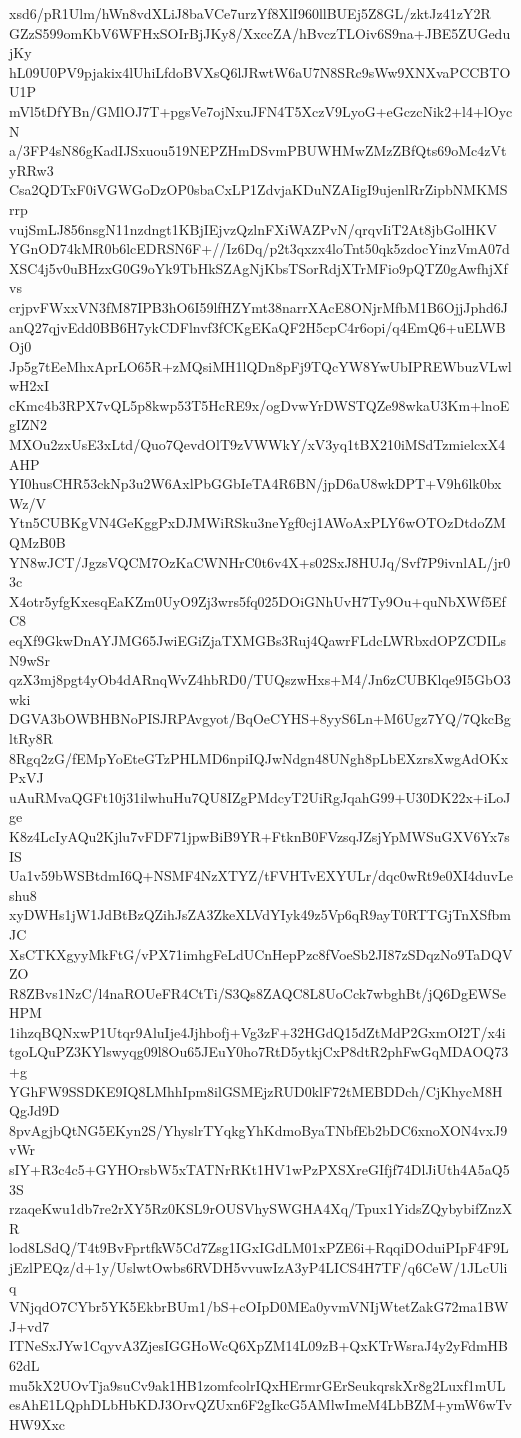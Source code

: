 xsd6/pR1Ulm/hWn8vdXLiJ8baVCe7urzYf8XlI960llBUEj5Z8GL/zktJz41zY2R
GZzS599omKbV6WFHxSOIrBjJKy8/XxccZA/hBvczTLOiv6S9na+JBE5ZUGedujKy
hL09U0PV9pjakix4lUhiLfdoBVXsQ6lJRwtW6aU7N8SRc9sWw9XNXvaPCCBTOU1P
mVl5tDfYBn/GMlOJ7T+pgsVe7ojNxuJFN4T5XczV9LyoG+eGczcNik2+l4+lOycN
a/3FP4sN86gKadIJSxuou519NEPZHmDSvmPBUWHMwZMzZBfQts69oMc4zVtyRRw3
Csa2QDTxF0iVGWGoDzOP0sbaCxLP1ZdvjaKDuNZAIigI9ujenlRrZipbNMKMSrrp
vujSmLJ856nsgN11nzdngt1KBjIEjvzQzlnFXiWAZPvN/qrqvIiT2At8jbGolHKV
YGnOD74kMR0b6lcEDRSN6F+//Iz6Dq/p2t3qxzx4loTnt50qk5zdocYinzVmA07d
XSC4j5v0uBHzxG0G9oYk9TbHkSZAgNjKbsTSorRdjXTrMFio9pQTZ0gAwfhjXfvs
crjpvFWxxVN3fM87IPB3hO6I59lfHZYmt38narrXAcE8ONjrMfbM1B6OjjJphd6J
anQ27qjvEdd0BB6H7ykCDFlnvf3fCKgEKaQF2H5cpC4r6opi/q4EmQ6+uELWBOj0
Jp5g7tEeMhxAprLO65R+zMQsiMH1lQDn8pFj9TQcYW8YwUbIPREWbuzVLwlwH2xI
cKmc4b3RPX7vQL5p8kwp53T5HcRE9x/ogDvwYrDWSTQZe98wkaU3Km+lnoEgIZN2
MXOu2zxUsE3xLtd/Quo7QevdOlT9zVWWkY/xV3yq1tBX210iMSdTzmielcxX4AHP
YI0husCHR53ckNp3u2W6AxlPbGGbIeTA4R6BN/jpD6aU8wkDPT+V9h6lk0bxWz/V
Ytn5CUBKgVN4GeKggPxDJMWiRSku3neYgf0cj1AWoAxPLY6wOTOzDtdoZMQMzB0B
YN8wJCT/JgzsVQCM7OzKaCWNHrC0t6v4X+s02SxJ8HUJq/Svf7P9ivnlAL/jr03c
X4otr5yfgKxesqEaKZm0UyO9Zj3wrs5fq025DOiGNhUvH7Ty9Ou+quNbXWf5EfC8
eqXf9GkwDnAYJMG65JwiEGiZjaTXMGBs3Ruj4QawrFLdcLWRbxdOPZCDILsN9wSr
qzX3mj8pgt4yOb4dARnqWvZ4hbRD0/TUQszwHxs+M4/Jn6zCUBKlqe9I5GbO3wki
DGVA3bOWBHBNoPISJRPAvgyot/BqOeCYHS+8yyS6Ln+M6Ugz7YQ/7QkcBgltRy8R
8Rgq2zG/fEMpYoEteGTzPHLMD6npiIQJwNdgn48UNgh8pLbEXzrsXwgAdOKxPxVJ
uAuRMvaQGFt10j31ilwhuHu7QU8IZgPMdcyT2UiRgJqahG99+U30DK22x+iLoJge
K8z4LcIyAQu2Kjlu7vFDF71jpwBiB9YR+FtknB0FVzsqJZsjYpMWSuGXV6Yx7sIS
Ua1v59bWSBtdmI6Q+NSMF4NzXTYZ/tFVHTvEXYULr/dqc0wRt9e0XI4duvLeshu8
xyDWHs1jW1JdBtBzQZihJsZA3ZkeXLVdYIyk49z5Vp6qR9ayT0RTTGjTnXSfbmJC
XsCTKXgyyMkFtG/vPX71imhgFeLdUCnHepPzc8fVoeSb2JI87zSDqzNo9TaDQVZO
R8ZBvs1NzC/l4naROUeFR4CtTi/S3Qs8ZAQC8L8UoCck7wbghBt/jQ6DgEWSeHPM
1ihzqBQNxwP1Utqr9AluIje4Jjhbofj+Vg3zF+32HGdQ15dZtMdP2GxmOI2T/x4i
tgoLQuPZ3KYlswyqg09l8Ou65JEuY0ho7RtD5ytkjCxP8dtR2phFwGqMDAOQ73+g
YGhFW9SSDKE9IQ8LMhhIpm8ilGSMEjzRUD0klF72tMEBDDch/CjKhycM8HQgJd9D
8pvAgjbQtNG5EKyn2S/YhyslrTYqkgYhKdmoByaTNbfEb2bDC6xnoXON4vxJ9vWr
sIY+R3c4c5+GYHOrsbW5xTATNrRKt1HV1wPzPXSXreGIfjf74DlJiUth4A5aQ53S
rzaqeKwu1db7re2rXY5Rz0KSL9rOUSVhySWGHA4Xq/Tpux1YidsZQybybifZnzXR
lod8LSdQ/T4t9BvFprtfkW5Cd7Zsg1IGxIGdLM01xPZE6i+RqqiDOduiPIpF4F9L
jEzlPEQz/d+1y/UslwtOwbs6RVDH5vvuwIzA3yP4LICS4H7TF/q6CeW/1JLcUliq
VNjqdO7CYbr5YK5EkbrBUm1/bS+cOIpD0MEa0yvmVNIjWtetZakG72ma1BWJ+vd7
ITNeSxJYw1CqyvA3ZjesIGGHoWcQ6XpZM14L09zB+QxKTrWsraJ4y2yFdmHB62dL
mu5kX2UOvTja9suCv9ak1HB1zomfcolrIQxHErmrGErSeukqrskXr8g2Luxf1mUL
esAhE1LQphDLbHbKDJ3OrvQZUxn6F2gIkcG5AMlwImeM4LbBZM+ymW6wTvHW9Xxc
